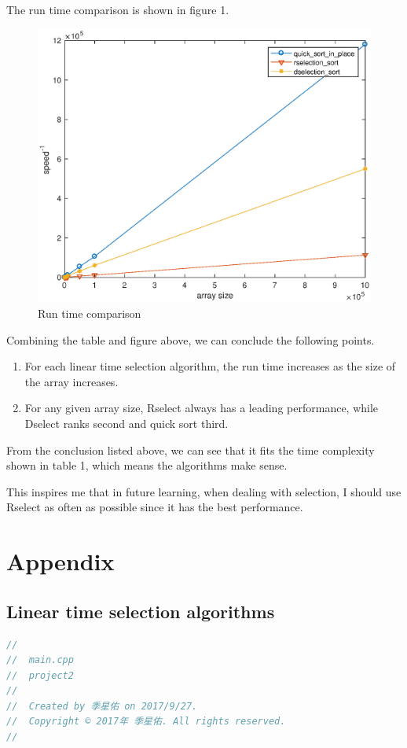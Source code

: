 \documentclass{article}
\begin{document}
\begin{spacing}{2.0}
The run time comparison is shown in figure 1. 
\begin{figure}[h!]
\begin{center}
\includegraphics[scale=1]{comparision.eps}
\caption{Run time comparison}
\end{center}
\end{figure}

Combining the table and figure above, we can conclude the following points.
\begin{enumerate}
\item For each linear time selection algorithm, the run time increases as the size of the array increases.\\
\item For any given array size, Rselect always has a leading performance, while Dselect ranks second and quick sort third.
\end{enumerate}

From the conclusion listed above, we can see that it fits the time complexity shown in table 1, which means the algorithms make sense.

This inspires me that in future learning, when dealing with selection, I should use Rselect as often as possible since it has the best performance.
\section{Appendix}
\subsection{Linear time selection algorithms}
\begin{lstlisting}[language=c++]
//
//  main.cpp
//  project2
//
//  Created by 季星佑 on 2017/9/27.
//  Copyright © 2017年 季星佑. All rights reserved.
//


\end{lstlisting}
\end{spacing}
\end{document}
